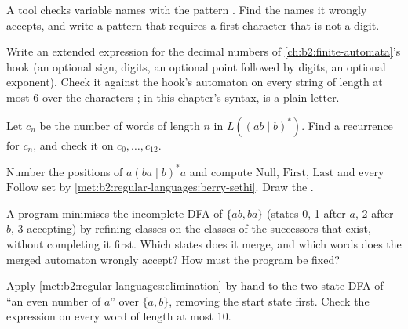 \begin{exercise}[$\star$]\label{exo:b2:regular-languages:2}
A tool checks variable names with the pattern \code{[a-z0-9_]+}. Find the names it wrongly accepts, and write a
pattern that requires a first character that is not a digit.
\end{exercise}

\begin{exercise}[$\star$]\label{exo:b2:regular-languages:3}
Write an extended expression for the decimal numbers of \cref{ch:b2:finite-automata}'s hook (an optional sign,
digits, an optional point followed by digits, an optional exponent). Check it against the hook's automaton on every
string of length at most 6 over the characters ; in this chapter's syntax,  is a plain
letter.
\end{exercise}

\begin{exercise}[$\star$]\label{exo:b2:regular-languages:4}
Let $c_n$ be the number of words of length $n$ in $L((ab \mid b)^*)$. Find a recurrence for $c_n$, and check it on
$c_0, \dots, c_{12}$.
\end{exercise}

\begin{exercise}[$\star\star$]\label{exo:b2:regular-languages:5}
Number the positions of $a(ba \mid b)^*a$ and compute $\mathrm{Null}$, $\mathrm{First}$, $\mathrm{Last}$ and every
$\mathrm{Follow}$ set by \cref{met:b2:regular-languages:berry-sethi}. Draw the .
\end{exercise}

\begin{exercise}[$\star\star$]\label{exo:b2:regular-languages:6}
A program minimises the incomplete DFA of $\{ab, ba\}$ (states 0, 1 after $a$, 2 after $b$, 3 accepting) by refining
classes on the classes of the successors that exist, without completing it first. Which states does it merge, and
which words does the merged automaton wrongly accept? How must the program be fixed?
\end{exercise}

\begin{exercise}[$\star\star$]\label{exo:b2:regular-languages:7}
Apply \cref{met:b2:regular-languages:elimination} by hand to the two-state DFA of ``an even number of $a$'' over
$\{a, b\}$, removing the start state first. Check the expression on every word of length at most 10.
\end{exercise}

